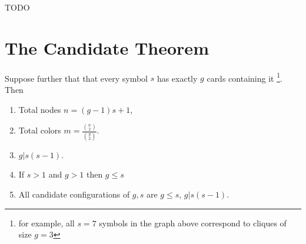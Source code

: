 \documentclass[11pt, oneside]{article} 	%
\begin{document}
TODO

\section{The Candidate Theorem}

\begin{framed}
Suppose further that that every symbol $s$ has exactly $g$ cards containing it \footnote{for example, all $s=7$ symbols in the graph above correspond to cliques of size $g=3$}.  Then \begin{enumerate}
\item Total nodes $n = (g-1)s + 1$, 
\item Total colors $m = \frac{{n \choose 2}}{{g \choose 2}}$.
\item $g | s(s-1)$.
\item If $s >1 $ and $g > 1$ then $g \leq s$ 
\item All candidate configurations of $g, s$ are $g \leq s$, $g | s(s-1)$.
\end{enumerate}
\end{framed}
\end{document}
